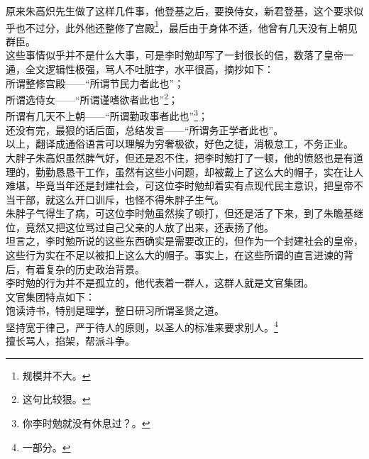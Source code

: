 \begin{multicols}{\theparacolNo}
原来朱高炽先生做了这样几件事，他登基之后，要换侍女，新君登基，这个要求似乎也不过分，此外他还整修了宫殿\footnote{规模并不大。}，最后由于身体不适，他曾有几天没有上朝见群臣。\\

这些事情似乎并不是什么大事，可是李时勉却写了一封很长的信，数落了皇帝一通，全文逻辑性极强，骂人不吐脏字，水平很高，摘抄如下：\\

所谓整修宫殿——“所谓节民力者此也”；\\

所谓选侍女——“所谓谨嗜欲者此也”\footnote{这句比较狠。}；\\

所谓有几天不上朝——“所谓勤政事者此也”\footnote{你李时勉就没有休息过？。}；\\

还没有完，最狠的话后面，总结发言——“所谓务正学者此也”。\\

以上，翻译成通俗语言可以理解为穷奢极欲，好色之徒，消极怠工，不务正业。\\

大胖子朱高炽虽然脾气好，但还是忍不住，把李时勉打了一顿，他的愤怒也是有道理的，勤勤恳恳干工作，虽然有这些小问题，却被戴上了这么大的帽子，实在让人难堪，毕竟当年还是封建社会，可这位李时勉却着实有点现代民主意识，把皇帝不当干部，就这么开口训斥，也怪不得朱胖子生气。\\

朱胖子气得生了病，可这位李时勉虽然挨了顿打，但还是活了下来，到了朱瞻基继位，竟然又把这位骂过自己父亲的人放了出来，还表扬了他。\\

坦言之，李时勉所说的这些东西确实是需要改正的，但作为一个封建社会的皇帝，这些行为实在不足以被扣上这么大的帽子。事实上，在这些所谓的直言进谏的背后，有着复杂的历史政治背景。\\

李时勉的行为并不是孤立的，他代表着一群人，这群人就是文官集团。\\

文官集团特点如下：\\

饱读诗书，特别是理学，整日研习所谓圣贤之道。\\

坚持宽于律己，严于待人的原则，以圣人的标准来要求别人。\footnote{一部分。}\\

擅长骂人，掐架，帮派斗争。\\


\end{multicols}
